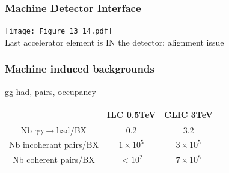 \documentclass{beamer}
\begin{document}
\begin{frame}
\frametitle{Machine Detector Interface}
\texttt{[image: Figure\_13\_14.pdf]}\\
Last accelerator element is IN the detector: alignment issue
\end{frame}

\begin{frame}
\frametitle{Machine induced backgrounds}
gg had, pairs, occupancy
\begin{tabular}{ccc}
 & ILC 0.5TeV & CLIC 3TeV\\
\hline
Nb $\gamma\gamma\to\textrm{had}$/BX & 0.2 & \alert{3.2}\\
\hline
Nb incoherant pairs/BX & $1\times 10^5$ & \alert{$3\times10^5$}\\
\hline
Nb coherent pairs/BX & $<10^2$ & $7\times 10^8$\\
\hline
\end{tabular}
\end{frame}
\end{document}
